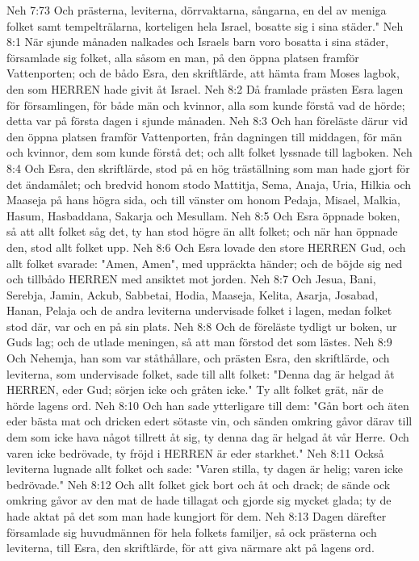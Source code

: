 Neh 7:73  Och prästerna, leviterna, dörrvaktarna, sångarna, en del av meniga folket samt tempelträlarna, korteligen hela Israel, bosatte sig i sina städer."
Neh 8:1  När sjunde månaden nalkades och Israels barn voro bosatta i sina städer, församlade sig folket, alla såsom en man, på den öppna platsen framför Vattenporten; och de bådo Esra, den skriftlärde, att hämta fram Moses lagbok, den som HERREN hade givit åt Israel.
Neh 8:2  Då framlade prästen Esra lagen för församlingen, för både män och kvinnor, alla som kunde förstå vad de hörde; detta var på första dagen i sjunde månaden.
Neh 8:3  Och han föreläste därur vid den öppna platsen framför Vattenporten, från dagningen till middagen, för män och kvinnor, dem som kunde förstå det; och allt folket lyssnade till lagboken.
Neh 8:4  Och Esra, den skriftlärde, stod på en hög träställning som man hade gjort för det ändamålet; och bredvid honom stodo Mattitja, Sema, Anaja, Uria, Hilkia och Maaseja på hans högra sida, och till vänster om honom Pedaja, Misael, Malkia, Hasum, Hasbaddana, Sakarja och Mesullam.
Neh 8:5  Och Esra öppnade boken, så att allt folket såg det, ty han stod högre än allt folket; och när han öppnade den, stod allt folket upp.
Neh 8:6  Och Esra lovade den store HERREN Gud, och allt folket svarade: "Amen, Amen", med uppräckta händer; och de böjde sig ned och tillbådo HERREN med ansiktet mot jorden.
Neh 8:7  Och Jesua, Bani, Serebja, Jamin, Ackub, Sabbetai, Hodia, Maaseja, Kelita, Asarja, Josabad, Hanan, Pelaja och de andra leviterna undervisade folket i lagen, medan folket stod där, var och en på sin plats.
Neh 8:8  Och de föreläste tydligt ur boken, ur Guds lag; och de utlade meningen, så att man förstod det som lästes.
Neh 8:9  Och Nehemja, han som var ståthållare, och prästen Esra, den skriftlärde, och leviterna, som undervisade folket, sade till allt folket: "Denna dag är helgad åt HERREN, eder Gud; sörjen icke och gråten icke." Ty allt folket grät, när de hörde lagens ord.
Neh 8:10  Och han sade ytterligare till dem: "Gån bort och äten eder bästa mat och dricken edert sötaste vin, och sänden omkring gåvor därav till dem som icke hava något tillrett åt sig, ty denna dag är helgad åt vår Herre. Och varen icke bedrövade, ty fröjd i HERREN är eder starkhet."
Neh 8:11  Också leviterna lugnade allt folket och sade: "Varen stilla, ty dagen är helig; varen icke bedrövade."
Neh 8:12  Och allt folket gick bort och åt och drack; de sände ock omkring gåvor av den mat de hade tillagat och gjorde sig mycket glada; ty de hade aktat på det som man hade kungjort för dem.
Neh 8:13  Dagen därefter församlade sig huvudmännen för hela folkets familjer, så ock prästerna och leviterna, till Esra, den skriftlärde, för att giva närmare akt på lagens ord.
